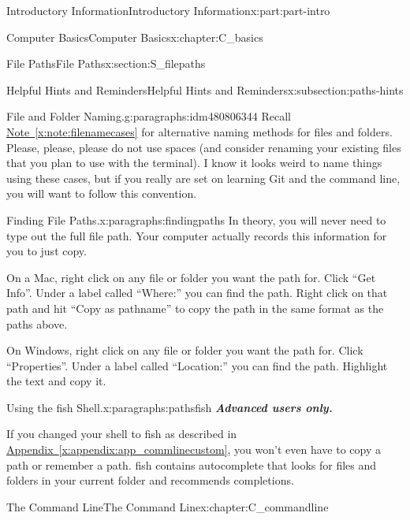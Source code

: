 \documentclass[oneside,10pt,]{book}
\newcommand{\xreffont}{\relax}
\newcommand{\alert}[1]{\textbf{\textit{#1}}}
\begin{document}
\begin{partptx}{Introductory Information}{}{Introductory Information}{}{}{x:part:part-intro}
\begin{chapterptx}{Computer Basics}{}{Computer Basics}{}{}{x:chapter:C_basics}
\begin{sectionptx}{File Paths}{}{File Paths}{}{}{x:section:S_filepaths}
\begin{subsectionptx}{Helpful Hints and Reminders}{}{Helpful Hints and Reminders}{}{}{x:subsection:paths-hints}
%
\begin{paragraphs}{File and Folder Naming.}{g:paragraphs:idm480806344}%
Recall \hyperref[x:note:filenamecases]{Note~{\xreffont\ref{x:note:filenamecases}}} for alternative naming methods for files and folders. Please, please, please do not use spaces (and consider renaming your existing files that you plan to use with the terminal). I know it looks weird to name things using these cases, but if you really are set on learning Git and the command line, you will want to follow this convention.%
\end{paragraphs}%
\begin{paragraphs}{Finding File Paths.}{x:paragraphs:findingpaths}%
%
In theory, you will never need to type out the full file path. Your computer actually records this information for you to just copy.%
\par
On a Mac, right click on any file or folder you want the path for. Click ``Get Info''. Under a label called ``Where:'' you can find the path. Right click on that path and hit ``Copy as pathname'' to copy the path in the same format as the paths above.%
\par
On Windows, right click on any file or folder you want the path for. Click ``Properties''. Under a label called ``Location:'' you can find the path. Highlight the text and copy it.%
\end{paragraphs}%
\begin{paragraphs}{Using the fish Shell.}{x:paragraphs:pathsfish}%
%
%
%
\alert{Advanced users only.}%
\par
If you changed your shell to fish as described in \hyperref[x:appendix:app_commlinecustom]{Appendix~{\xreffont\ref{x:appendix:app_commlinecustom}}}, you won't even have to copy a path or remember a path. fish contains autocomplete that looks for files and folders in your current folder and recommends completions.%
\end{paragraphs}%
\end{subsectionptx}
\end{sectionptx}
\end{chapterptx}
%
\typeout{************************************************}
\typeout{************************************************}
%
\begin{chapterptx}{The Command Line}{}{The Command Line}{}{}{x:chapter:C_commandline}
\begin{introduction}{}%

\end{introduction}
\end{chapterptx}
\end{partptx}
\end{document}
